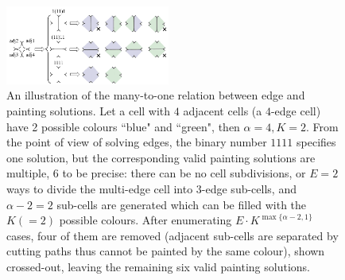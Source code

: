 \documentclass[journal]{IEEEtran}
\begin{document}
\begin{figure}[t]
\centering
\includegraphics[width = 0.48\textwidth]{figures/many_to_one_4}
\caption{An illustration of the many-to-one relation between edge and painting solutions. 
Let a cell with $4$ adjacent cells (a $4$-edge cell) have 2 possible colours ``blue" and ``green", then $\alpha = 4, K = 2$. From the point of view of solving edges, the binary number $1111$ specifies one solution, but the corresponding valid painting solutions are multiple, $6$ to be precise: there can be no cell subdivisions, or $E=2$ ways to divide the multi-edge cell into $3$-edge sub-cells, and $\alpha-2 = 2$ sub-cells are generated which can be filled with the $K (=2)$ possible colours. After enumerating $E\cdot K^{\max\{\alpha-2, 1\}}$ cases, four of them are removed (adjacent sub-cells are separated by cutting paths thus cannot be painted by the same colour), shown crossed-out, leaving the remaining 
six valid painting solutions.
}
\label{fig:many_to_one}
\end{figure}
\end{document}
